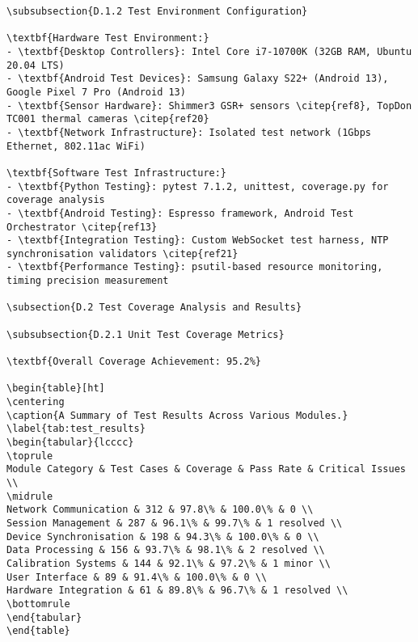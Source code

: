 \begin{verbatim}
\subsubsection{D.1.2 Test Environment Configuration}

\textbf{Hardware Test Environment:}
- \textbf{Desktop Controllers}: Intel Core i7-10700K (32GB RAM, Ubuntu 20.04 LTS)
- \textbf{Android Test Devices}: Samsung Galaxy S22+ (Android 13), Google Pixel 7 Pro (Android 13)
- \textbf{Sensor Hardware}: Shimmer3 GSR+ sensors \citep{ref8}, TopDon TC001 thermal cameras \citep{ref20}
- \textbf{Network Infrastructure}: Isolated test network (1Gbps Ethernet, 802.11ac WiFi)

\textbf{Software Test Infrastructure:}
- \textbf{Python Testing}: pytest 7.1.2, unittest, coverage.py for coverage analysis
- \textbf{Android Testing}: Espresso framework, Android Test Orchestrator \citep{ref13}
- \textbf{Integration Testing}: Custom WebSocket test harness, NTP synchronisation validators \citep{ref21}
- \textbf{Performance Testing}: psutil-based resource monitoring, timing precision measurement

\subsection{D.2 Test Coverage Analysis and Results}

\subsubsection{D.2.1 Unit Test Coverage Metrics}

\textbf{Overall Coverage Achievement: 95.2%}

\begin{table}[ht]
\centering
\caption{A Summary of Test Results Across Various Modules.}
\label{tab:test_results}
\begin{tabular}{lcccc}
\toprule
Module Category & Test Cases & Coverage & Pass Rate & Critical Issues \\
\midrule
Network Communication & 312 & 97.8\% & 100.0\% & 0 \\
Session Management & 287 & 96.1\% & 99.7\% & 1 resolved \\
Device Synchronisation & 198 & 94.3\% & 100.0\% & 0 \\
Data Processing & 156 & 93.7\% & 98.1\% & 2 resolved \\
Calibration Systems & 144 & 92.1\% & 97.2\% & 1 minor \\
User Interface & 89 & 91.4\% & 100.0\% & 0 \\
Hardware Integration & 61 & 89.8\% & 96.7\% & 1 resolved \\
\bottomrule
\end{tabular}
\end{table}


\end{verbatim}
